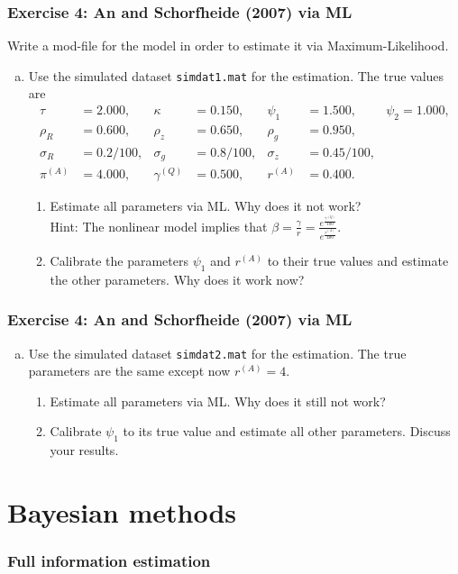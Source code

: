 \documentclass{beamer} %
\newcounter{saveenumi}
\newcommand{\seti}{\setcounter{saveenumi}{\value{enumi}}}
\newcommand{\conti}{\setcounter{enumi}{\value{saveenumi}}}
\begin{document}
\begin{frame}\frametitle{Exercise 4: An and Schorfheide (2007) via ML}
Write a mod-file for the model in order to estimate it via Maximum-Likelihood.
  \begin{enumerate}[(a)]
    \item Use the simulated dataset \texttt{simdat1.mat} for the estimation. The true values are
   \begin{align*}
          \tau&=2.000,&	\kappa&=0.150, &\psi_1 &=1.500,	&\psi_2=1.000,\\
          \rho_R&=0.600,	&\rho_z &=0.650,& \rho_g&=0.950, \\
          \sigma_R&=0.2/100, &\sigma_g&=0.8/100 ,&	\sigma_z&=0.45/100 ,\\
           \pi^{(A)}&=4.000, &\gamma^{(Q)}&=0.500, &r^{(A)}&=0.400.
    \end{align*}
    \begin{enumerate}
    \item Estimate all parameters via ML. Why does it not work? \\Hint: The nonlinear model implies that $\beta=\frac{\gamma}{r}=\frac{e^{\frac{\gamma^{(Q)}}{100}}}{e^{\frac{r^{(A)}}{400}}}$.
    \item Calibrate the parameters $\psi_1$ and $r^{(A)}$ to their true values and estimate the other parameters. Why does it work now?
  \end{enumerate}\seti
  \end{enumerate}
\end{frame}

\begin{frame}\frametitle{Exercise 4: An and Schorfheide (2007) via ML}
    \begin{enumerate}[(a)]\conti
    \item Use the simulated dataset \texttt{simdat2.mat} for the estimation. The true parameters are the same except now $r^{(A)}=4$.
    \begin{enumerate}
      \item Estimate all parameters via ML. Why does it still not work?
      \item Calibrate $\psi_1$ to its true value and estimate all other parameters. Discuss your results.
    \end{enumerate}
    \end{enumerate}
\end{frame}

\section{Bayesian methods}
\begin{frame}\frametitle{Full information estimation}
  \tableofcontents[currentsection]
\end{frame}
\end{document}
